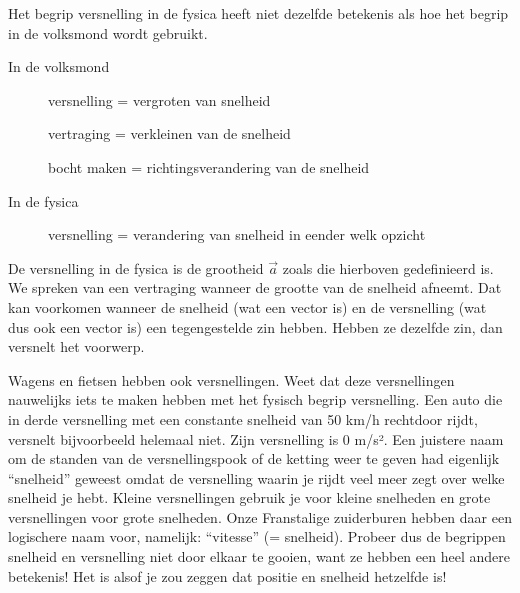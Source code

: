 \documentclass{ximera}
\begin{document}
\begin{remark}
	Het begrip versnelling in de fysica heeft niet dezelfde betekenis als hoe het begrip in de volksmond wordt gebruikt.
	\begin{description}
		\item[In de volksmond] 
			\begin{itemize}
				versnelling = vergroten van snelheid

				vertraging = verkleinen van de snelheid

				bocht maken = richtingsverandering van de snelheid
			\end{itemize}
		\item[In de fysica]
			versnelling = verandering van snelheid in eender welk opzicht
	\end{description}

	De versnelling in de fysica is de grootheid $\vec{a}$ zoals die hierboven gedefinieerd is. We spreken van een vertraging wanneer de grootte van de snelheid afneemt. Dat kan voorkomen wanneer de snelheid (wat een vector is) en de versnelling (wat dus ook een vector is) een tegengestelde zin hebben. Hebben ze dezelfde zin, dan versnelt het voorwerp.



\end{remark}

\begin{remark}

Wagens en fietsen hebben ook versnellingen. 
Weet dat deze versnellingen nauwelijks iets te maken hebben met het fysisch begrip versnelling. 
Een auto die in derde versnelling met een constante snelheid van 50 km/h rechtdoor rijdt, versnelt bijvoorbeeld helemaal niet. 
Zijn versnelling is 0 m/s². 
Een juistere naam om de standen van de versnellingspook of de ketting weer te geven had eigenlijk “snelheid” geweest omdat de versnelling waarin je rijdt veel meer zegt over welke snelheid je hebt. 
Kleine versnellingen gebruik je voor kleine snelheden en grote versnellingen voor grote snelheden. 
Onze Franstalige zuiderburen hebben daar een logischere naam voor, namelijk: “vitesse” (= snelheid). 
Probeer dus de begrippen snelheid en versnelling niet door elkaar te gooien, want ze hebben een heel andere betekenis! 
Het is alsof je zou zeggen dat positie en snelheid hetzelfde is!


\end{remark}
\end{document}
